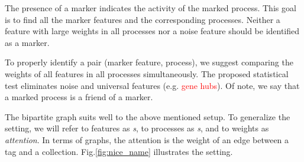 \documentclass{llncs}
\begin{document}
The presence of a marker indicates the activity of the marked process.
This goal is to find all the marker features and the corresponding processes.
Neither a feature with large weights in all processes nor a noise feature should be identified as a marker.

To properly identify a pair (marker feature, process), we suggest comparing the weights of all features in all processes simultaneously. 
The proposed statistical test eliminates noise and universal features (e.g. \textcolor{red}{gene hubs}).
Of note, we say that a marked process is a friend of a marker.








The bipartite graph suits well to the above mentioned setup. To generalize the setting, we will refer to features as \textit{{\tag}s}, to processes as \textit{{\collection}s}, and to weights as \textit{attention}. In terms of graphs, the attention is the weight of an edge between a tag and a collection. Fig.\ref{fig:nice_name} illustrates the setting.
\end{document}
